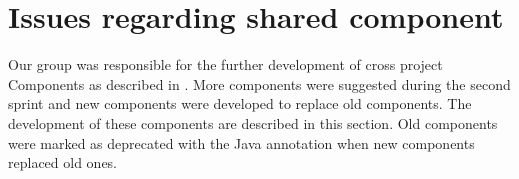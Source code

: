 
\section{Issues regarding shared component}

Our group was responsible for the further development of cross project \giraf Components as described in . More components were suggested during the second sprint and new components were developed to replace old components. The development of these components are described in this section. Old components were marked as deprecated with the  Java annotation when new components replaced old ones.  



